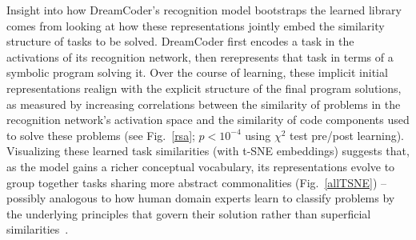 \documentclass[12pt]{article}
\begin{document}
Insight into how DreamCoder's recognition model bootstraps the learned library comes from looking at how these  %
representations 
jointly embed the similarity structure of %
tasks to be solved. 
DreamCoder first encodes a task in the activations of its recognition network,
then rerepresents that task in terms of a symbolic program solving it. %
Over the course of learning, these implicit initial representations realign with the explicit structure of the final program solutions,
as measured by increasing correlations between the similarity of problems in the recognition network's activation space and the similarity of code components used to solve these problems %
(see Fig.~\ref{rsa}; $p < 10^{-4}$ using $\chi^2$ test pre/post learning).
Visualizing these learned task similarities (with t-SNE embeddings) suggests that, as the model gains a richer conceptual vocabulary,
its representations evolve to group together tasks sharing more abstract commonalities (Fig.~\ref{allTSNE}) -- possibly analogous to how human domain experts learn to classify problems by the underlying principles that govern their solution rather than superficial similarities~\cite{chi1981categorization,chi1988nature}.

\end{document}
